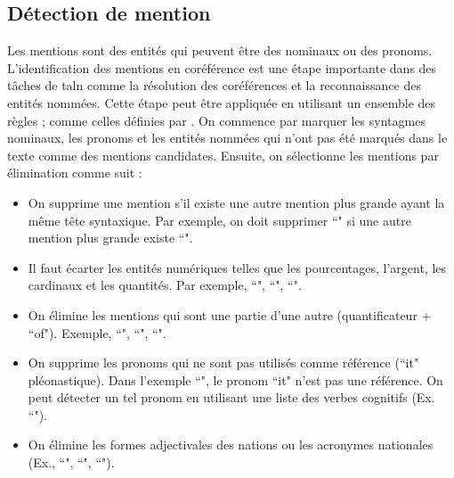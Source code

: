 \documentclass{KodeBook}
\begin{document}
\subsection{Détection de mention}

Les mentions sont des entités qui peuvent être des  nominaux ou des pronoms.
L'identification des mentions en coréférence est une étape importante dans des tâches de \ac{taln} comme la résolution des coréférences et la reconnaissance des entités nommées.
Cette étape peut être appliquée en utilisant un ensemble des règles ; comme celles définies par \citet{2013-lee-al}.
On commence par marquer les syntagmes nominaux, les pronoms et les entités nommées qui n'ont pas été marqués dans le texte comme des mentions candidates. 
Ensuite, on sélectionne les mentions par élimination comme suit :
\begin{itemize}
	\item On supprime une mention s'il existe une autre mention plus grande ayant la même tête syntaxique. 
	Par exemple, on doit supprimer ``" si une autre mention plus grande existe ``". 
	
	\item Il faut écarter les entités numériques telles que les pourcentages, l'argent, les cardinaux et les quantités. 
	Par exemple, ``", ``", ``".
	
	\item On élimine les mentions qui sont une partie d'une autre (quantificateur + ``of"). 
	Exemple, ``", ``", ``".
	
	\item On supprime les pronoms qui ne sont pas utilisés comme référence (``it" pléonastique). 
	Dans l'exemple ``", le pronom ``it" n'est pas une référence. 
	On peut détecter un tel pronom en utilisant une liste des verbes cognitifs (Ex. ``").
	
	\item On élimine les formes adjectivales des nations ou les acronymes nationales (Ex.,
	``", ``", ``").
\end{itemize}
\end{document}
